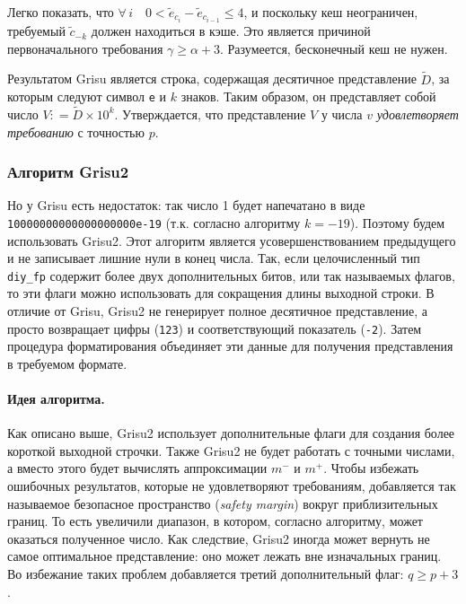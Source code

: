 Легко показать, что $\forall \, i \quad 0 < \tilde{e}_{c_i} - \tilde{e}_{c_{i-1}} \leqslant 4$, и поскольку кеш неограничен, требуемый $\tilde{c}_{-k}$ должен находиться в кэше. 
Это является причиной первоначального требования $\gamma \geqslant \alpha + 3$.
Разумеется, бесконечный кеш не нужен. 

Результатом \textsf{Grisu} является строка, содержащая десятичное представление $\tilde{D}$, за которым следуют символ \texttt{e} и $k$ знаков. 
Таким образом, он представляет собой число $V: = \tilde{D} \times 10^k$. 
Утверждается, что представление $V$ у числа $v$ \textit{удовлетворяет требованию} с точностью $p$.

\subsubsection{Алгоритм \textsf{Grisu2}}
Но у \textsf{Grisu} есть недостаток: так число 1 будет напечатано в виде \\ \texttt{10000000000000000000e-19} (т.к. согласно алгоритму $k=-19$).
Поэтому будем использовать \textsf{Grisu2}.
Этот алгоритм является усовершенствованием предыдущего и не записывает лишние нули в конец числа.
Так, если целочисленный тип \texttt{diy\_fp} содержит более двух дополнительных битов, или так называемых флагов, то эти флаги можно использовать для сокращения длины выходной строки.
В отличие от \textsf{Grisu}, \textsf{Grisu2} не генерирует полное десятичное представление, а просто возвращает цифры (\texttt{123}) и соответствующий показатель (\texttt{-2}). 
Затем процедура форматирования объединяет эти данные для получения представления в требуемом формате.

\paragraph{Идея алгоритма.} 
Как описано выше, \textsf{Grisu2} использует дополнительные флаги для создания более короткой выходной строчки. 
Также \textsf{Grisu2} не будет работать с точными числами, а вместо этого будет вычислять аппроксимации $m^{-}$ и $m^+$. 
Чтобы избежать ошибочных результатов, которые не удовлетворяют требованиям, добавляется так называемое безопасное пространство (\textit{safety margin}) вокруг приблизительных границ.
То есть увеличили диапазон, в котором, согласно алгоритму, может оказаться полученное число.  
Как следствие, \textsf{Grisu2} иногда может вернуть не самое оптимальное представление: оно может лежать вне изначальных границ. 
Во избежание таких проблем добавляется третий дополнительный флаг: $q \geqslant p + 3$.

